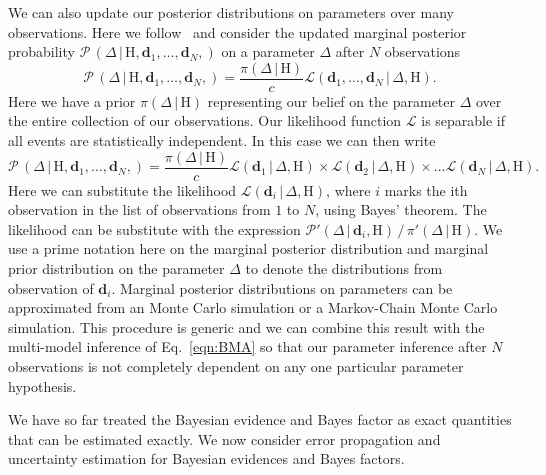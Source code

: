 We can also update our posterior distributions on parameters over many observations. Here we follow~\cite{dpac_technical} and consider the updated marginal posterior probability $\mathcal{P} \, \left(\Delta \, | \, \mathrm{H}, \mathbf{d}_1, \ldots, \mathbf{d}_N, \right)$ on a parameter $\Delta$ after $N$ observations
\begin{equation}
    \mathcal{P} \, \left(\Delta \, | \, \mathrm{H}, \mathbf{d}_1, \ldots, \mathbf{d}_N, \right) = \frac{\pi (\Delta \, | \, \mathrm{H} )}{c} \mathcal{L} (\mathbf{d}_1, \ldots, \mathbf{d}_N \, | \, \Delta , \mathrm{H}). 
\end{equation}
Here we have a prior $\pi (\Delta \, | \, \mathrm{H} )$ representing our belief on the parameter $\Delta$ over the entire collection of our observations. Our likelihood function $\mathcal{L}$ is separable if all events are statistically independent. In this case we can then write
\begin{equation}
    \mathcal{P} \, \left(\Delta \, | \, \mathrm{H}, \mathbf{d}_1, \ldots, \mathbf{d}_N, \right) = \frac{\pi (\Delta \, | \, \mathrm{H} )}{c} \mathcal{L} (\mathbf{d}_1  \, | \, \Delta , \mathrm{H}) \times \mathcal{L} (\mathbf{d}_2  \, | \, \Delta , \mathrm{H}) \times \ldots \mathcal{L} (\mathbf{d}_N  \, | \, \Delta , \mathrm{H}).
\end{equation}
Here we can substitute the likelihood $\mathcal{L}(\mathbf{d}_i  \, | \, \Delta , \mathrm{H})$, where $i$ marks the ith observation in the list of observations from $1$ to $N$, using Bayes' theorem. The likelihood can be substitute with the expression $\mathcal{P}' (\Delta \, | \, \mathbf{d}_i, \mathrm{H}) \, / \, \pi'(\Delta \, | \, \mathrm{H})$. We use a prime notation here on the marginal posterior distribution and marginal prior distribution on the parameter $\Delta$ to denote the distributions from observation of $\mathbf{d}_i$. Marginal posterior distributions on parameters can be approximated from an Monte Carlo simulation or a Markov-Chain Monte Carlo simulation. This procedure is generic and we can combine this result with the multi-model inference of Eq.~\ref{eqn:BMA} so that our parameter inference after $N$ observations is not completely dependent on any one particular parameter hypothesis.

We have so far treated the Bayesian evidence and Bayes factor as exact quantities that can be estimated exactly. We now consider error propagation and uncertainty estimation for Bayesian evidences and Bayes factors.

